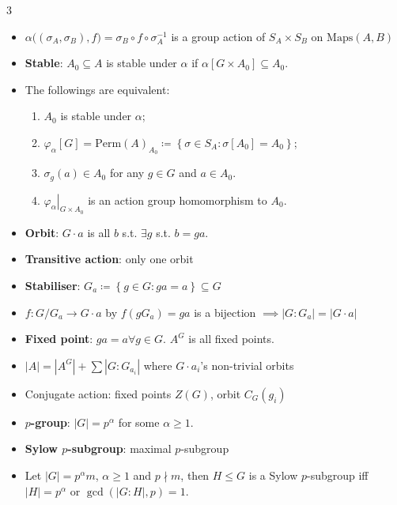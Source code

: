 \documentclass[10pt]{article}
\newcommand{\abs}[1]{\left\lvert#1\right\rvert} %
\begin{document}
\begin{multicols*}{3}
\begin{itemize}
            \item $\alpha\bigl(\left(\sigma_A, \sigma_B\right), f\bigr) = \sigma_B \circ f \circ \sigma_A^{-1}$ is a group action of $S_A \times S_B$ on $\mathrm{Maps}\left(A, B\right)$
            \item \textbf{Stable}: $A_0 \subseteq A$ is stable under $\alpha$ if $\alpha\left[G \times A_0\right] \subseteq A_0$.
            \item The followings are equivalent:
            \begin{enumerate}
                \item $A_0$ is stable under $\alpha$;
                \item $\varphi_{\alpha}\left[G\right] = \mathrm{Perm}\left(A\right)_{A_0} \coloneqq \left\{\sigma \in S_A \colon \sigma\left[A_0\right] = A_0\right\}$;
                \item $\sigma_g\left(a\right) \in A_0$ for any $g \in G$ and $a \in A_0$.
                \item $\left.\varphi_{\alpha}\right\rvert_{G \times A_0}$ is an action group homomorphism to $A_0$.
            \end{enumerate}
            \item \textbf{Orbit}: $G \cdot a$ is all $b$ s.t. $\exists g$ s.t. $b = ga$.
            \item \textbf{Transitive action}: only one orbit
            \item \textbf{Stabiliser}: $G_a \coloneqq \left\{g \in G \colon ga = a\right\} \subseteq G$
            \item $f \colon G \slash G_a \to G \cdot a$ by $f\left(gG_a\right) = ga$ is a bijection $\implies \abs{G \colon G_a} = \abs{G \cdot a}$
            \item \textbf{Fixed point}: $ga = a \forall g \in G$. $A^G$ is all fixed points.
            \item $\abs{A} = \abs{A^G} + \sum\abs{G \colon G_{a_i}}$ where $G \cdot a_i$'s non-trivial orbits
            \item Conjugate action: fixed points $Z\left(G\right)$, orbit $C_G\left(g_i\right)$
            \item \textbf{$p$-group}: $\abs{G} = p^{\alpha}$ for some $\alpha \geq 1$. 
            \item \textbf{Sylow $p$-subgroup}: maximal $p$-subgroup
            \item Let $\abs{G} = p^{\alpha}m$, $\alpha \geq 1$ and $p \nmid m$, then $H \leq G$ is a Sylow $p$-subgroup iff $\abs{H} = p^{\alpha}$ or $\gcd\left(\abs{G \colon H}, p\right) = 1$.

\end{itemize}
\end{multicols*}
\end{document}
